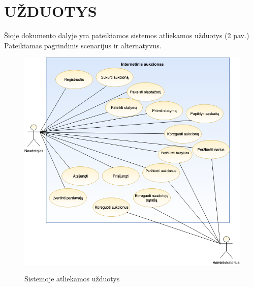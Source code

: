\documentclass{VUMIFPSkursinis}
\begin{document}
	\newpage
	\newpage
	\section{UŽDUOTYS}
	Šioje dokumento dalyje yra pateikiamos sistemos atliekamos užduotys  (2 pav.) Pateikiamas pagrindinis scenarijus ir alternatyvūs.
	\begin{figure}[H]
		\centering
		\includegraphics[width=\linewidth]{img/UseCaseDiagram.png}
		\label{fig:usecase}
		\caption{Sistemoje atliekamos užduotys}
	\end{figure}
	
\end{document}
